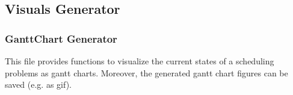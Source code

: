 \documentclass[letterpaper,10pt,english]{sphinxmanual}
\begin{document}
\subsection{Visuals Generator}
\label{\detokenize{visuals_generator:visuals-generator}}\label{\detokenize{visuals_generator::doc}}

\subsubsection{Gantt\sphinxhyphen{}Chart Generator}
\label{\detokenize{visuals_generator:module-visuals_generator.gantt_chart}}\label{\detokenize{visuals_generator:gantt-chart-generator}}
\sphinxAtStartPar
This file provides functions to visualize the current states of a scheduling problems as gantt charts.
Moreover, the generated gantt chart figures can be saved (e.g. as gif).
\end{document}
